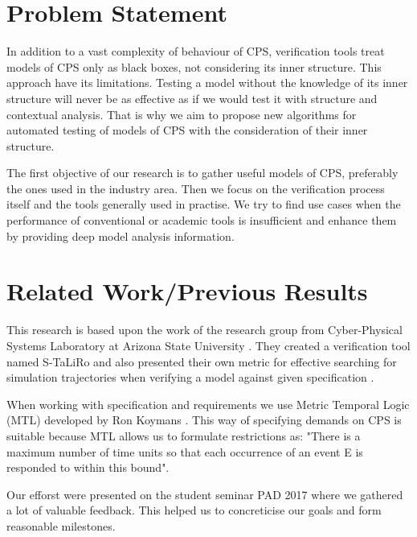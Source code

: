 \section{Problem Statement}
In addition to a vast complexity of behaviour of CPS, verification tools treat models of CPS only as black boxes, not considering its inner structure. This approach have its limitations. Testing a model without the knowledge of its inner structure will never be as effective as if we would test it with structure and contextual analysis. That is why we aim to propose new algorithms for automated testing of models of CPS with the consideration of their inner structure.

The first objective of our research is to gather useful models of CPS, preferably the ones used in the industry area. Then we focus on the verification process itself and the tools generally used in practise. We try to find use cases when the performance of conventional or academic tools is insufficient and enhance them by providing deep model analysis information.

\section{Related Work/Previous Results}
This research is based upon the work of the research group from Cyber-Physical Systems Laboratory at Arizona State University  \cite{Fainekos:sTaLiRo,Fainekos:robustness,Fainekos:testCaseGeneration,Fainekos:MiningProperties}. They created a verification tool named S-TaLiRo \cite{Fainekos:sTaLiRo} and also presented their own metric for effective searching for simulation trajectories when verifying a model against given specification \cite{Fainekos:robustness}.

When working with specification and requirements we use Metric Temporal Logic (MTL) developed by Ron Koymans \cite{Koymans:MTL}. This way of specifying demands on CPS is suitable because MTL allows us to formulate restrictions as: "There is a maximum number of time units so that each occurrence of an event E is responded to within this bound".

Our efforst were presented on the student seminar PAD 2017 \cite{TA:PAD} where we gathered a lot of valuable feedback. This helped us to concreticise our goals and form reasonable milestones.

